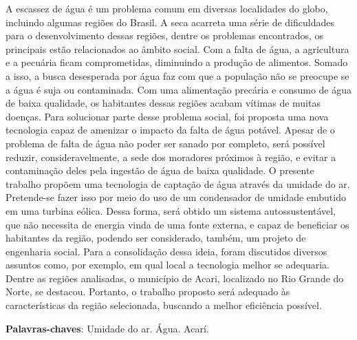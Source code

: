 \begin{resumo}
 
 A escassez de água é um problema comum em diversas localidades do globo, incluindo algumas regiões do Brasil. 
 A seca acarreta uma série de dificuldades para o desenvolvimento dessas regiões, dentre os problemas encontrados,
 os principais estão relacionados ao âmbito social. Com a falta  de água, a agricultura e a pecuária ficam comprometidas,
 diminuindo a produção de alimentos. Somado a isso, a busca desesperada por água faz com que a população não se preocupe
 se a água é suja ou contaminada. Com uma alimentação precária e consumo de água de baixa qualidade, os habitantes dessas
 regiões acabam vítimas de muitas doenças. Para solucionar parte desse problema social, foi proposta uma nova tecnologia
 capaz de amenizar o impacto da falta de água potável. Apesar de o problema de falta de água não poder ser sanado por completo,
 será possível reduzir, consideravelmente, a sede dos moradores próximos à região, e evitar a contaminação deles pela ingestão
 de água de baixa qualidade. O presente trabalho propõem uma tecnologia de captação de água através da umidade do ar.
 Pretende-se fazer isso por meio do uso de um condensador de umidade embutido em uma turbina eólica. Dessa forma, será
 obtido um sistema autossustentável, que não necessita de energia vinda de uma fonte externa, e capaz de beneficiar os 
 habitantes da região, podendo ser considerado, também, um projeto de engenharia social. Para a consolidação dessa ideia,
 foram discutidos diversos assuntos como, por exemplo, em qual local a tecnologia melhor se adequaria. Dentre as regiões 
 analisadas, o município de Acari, localizado no Rio Grande do Norte, se destacou. Portanto, o trabalho proposto será adequado
 às características da região selecionada, buscando a melhor eficiência possível.

 \vspace{\onelineskip}
    
 \noindent
 \textbf{Palavras-chaves}: Umidade do ar. Água. Acarí.
\end{resumo}
